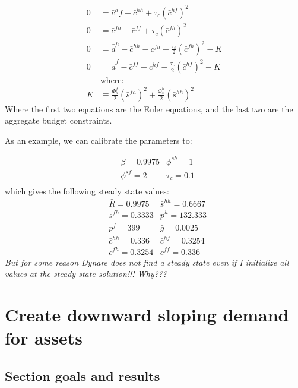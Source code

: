 \documentclass[a4paper]{article}
\begin{document}
\begin{align*}
0 &= \bar c^hf{} -\bar c^{hh} + \tau_c (\bar c^{hf})^2\\
0 &= \bar c^{fh} -\bar c^{ff} + \tau_c (\bar c^{fh})^2\\
0 &=\bar d^h -\bar c^{hh} - c^{fh} - \frac{\tau_c}{2} (\bar c^{fh})^2 - K\\
0 &=\bar d^f -\bar c^{ff} - c^{hf} - \frac{\tau_c}{2} (\bar c^{hf})^2 - K\\
& \text{where:} \\  
K &\equiv \frac{\Phi^f_s}{2}(\bar s^{fh})^2 + \frac{\Phi^h_s}{2}(\bar s^{hh})^2
\end{align*}
Where the first two equations are the Euler equations, and the last two are the aggregate budget constraints. 

As an example, we can calibrate the parameters to:

\begin{align*}
& \beta = 0.9975
& \phi^{sh} = 1 \\
& \phi^{sf} = 2 
& \tau_c = 0.1\\
\end{align*}
which gives the following steady state values:
\begin{align*}
& \bar R=0.9975
& \bar s^{hh} = 0.6667 \\
& \bar s^{fh}= 0.3333
& \bar p^h = 132.333\\
& \bar p^f = 399
& \bar g = 0.0025 \\
& \bar c^{hh}= 0.336
& \bar c^{hf} = 0.3254\\
& \bar c^{fh} = 0.3254
& \bar c^{ff} = 0.336
\end{align*}
\emph{But for some reason Dynare does not find a steady state even if I initialize all values at the steady state solution!!! Why???}



\newpage






\section{Create downward sloping demand for assets}\label{HoldingCost}
\subsection{Section goals and results}
\end{document}
